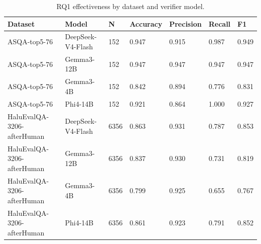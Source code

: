 \begin{table}[htbp]
\centering
\caption{RQ1 effectiveness by dataset and verifier model.}
\label{tab:rq1-effectiveness}
\begin{tabular}{lllllll}
\toprule
Dataset & Model & N & Accuracy & Precision & Recall & F1 \\
\midrule
ASQA-top5-76 & DeepSeek-V4-Flash & 152 & 0.947 & 0.915 & 0.987 & 0.949 \\
ASQA-top5-76 & Gemma3-12B & 152 & 0.947 & 0.947 & 0.947 & 0.947 \\
ASQA-top5-76 & Gemma3-4B & 152 & 0.842 & 0.894 & 0.776 & 0.831 \\
ASQA-top5-76 & Phi4-14B & 152 & 0.921 & 0.864 & 1.000 & 0.927 \\
HaluEvalQA-3206-afterHuman & DeepSeek-V4-Flash & 6356 & 0.863 & 0.931 & 0.787 & 0.853 \\
HaluEvalQA-3206-afterHuman & Gemma3-12B & 6356 & 0.837 & 0.930 & 0.731 & 0.819 \\
HaluEvalQA-3206-afterHuman & Gemma3-4B & 6356 & 0.799 & 0.925 & 0.655 & 0.767 \\
HaluEvalQA-3206-afterHuman & Phi4-14B & 6356 & 0.861 & 0.923 & 0.791 & 0.852 \\
\bottomrule
\end{tabular}
\end{table}
